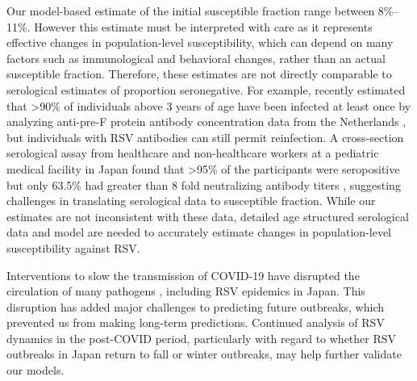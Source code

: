 \documentclass[12pt]{article}
\begin{document}
Our model-based estimate of the initial susceptible fraction range between 8\%--11\%.
However this estimate must be interpreted with care as it represents effective changes in population-level susceptibility, which can depend on many factors such as immunological and behavioral changes, rather than an actual susceptible fraction.
Therefore, these estimates are not directly comparable to serological estimates of proportion seronegative.
For example, \cite{nakajo2023age} recently estimated that >90\% of individuals above 3 years of age have been infected at least once by analyzing anti-pre-F protein antibody concentration data from the Netherlands \citep{andeweg2021population,berbers2021antibody}, but individuals with RSV antibodies can still permit reinfection.
A cross-section serological assay from healthcare and non-healthcare workers at a pediatric medical facility in Japan found that >95\% of the participants were seropositive but only 63.5\% had greater than 8 fold neutralizing antibody titers \citep{shoji2025factors}, suggesting challenges in translating serological data to susceptible fraction.
While our estimates are not inconsistent with these data, detailed age structured serological data and model are needed to accurately estimate changes in population-level susceptibility against RSV.

Interventions to slow the transmission of COVID-19 have disrupted the circulation of many pathogens \citep{baker2020impact,eden2022off,chen2024covid,park2024predicting}, including RSV epidemics in Japan.
This disruption has added major challenges to predicting future outbreaks, which prevented us from making long-term predictions.
Continued analysis of RSV dynamics in the post-COVID period, particularly with regard to whether RSV outbreaks in Japan return to fall or winter outbreaks, may help further validate our models.
\end{document}
